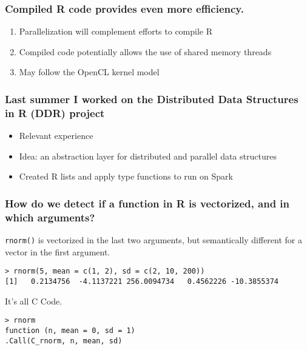 \documentclass{beamer}
\begin{document}
\begin{frame}

    \frametitle{Compiled R code provides even more efficiency.}

\begin{enumerate}
    \item Parallelization will complement efforts to compile R
    \item Compiled code potentially allows the use of shared memory threads
    \item May follow the OpenCL kernel model
\end{enumerate}


\end{frame}
\begin{frame}

    \frametitle{Last summer I worked on the Distributed Data Structures in
R (DDR) project}


\begin{itemize}
    \item Relevant experience
    \item Idea: an abstraction layer for distributed and parallel data structures
    \item Created R lists and apply type functions to run on Spark
\end{itemize}


\end{frame}
\begin{frame}[fragile]

    \frametitle{How do we detect if a function in R is vectorized, and in
    which arguments?}

    \texttt{rnorm()} is vectorized in the last two arguments, but
    semantically different for a vector in the first argument.

\begin{verbatim}
> rnorm(5, mean = c(1, 2), sd = c(2, 10, 200))
[1]   0.2134756  -4.1137221 256.0094734   0.4562226 -10.3855374
\end{verbatim}

It's all C Code.

\begin{verbatim}
> rnorm
function (n, mean = 0, sd = 1)
.Call(C_rnorm, n, mean, sd)
\end{verbatim}

\end{frame}
\end{document}
